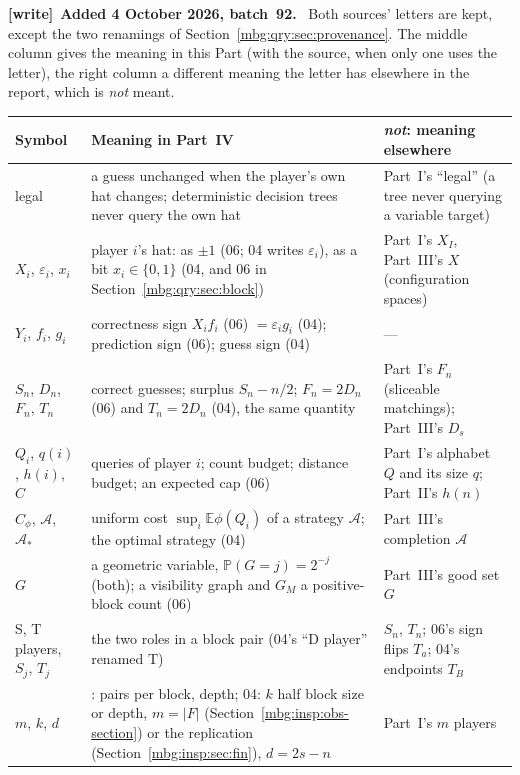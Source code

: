 \documentclass[11pt,letterpaper]{article}
\theoremstyle{definition}
\newcommand{\E}{\mathbb E}
\newcommand{\Prb}{\mathbb P}
\newcommand{\A}{\mathcal A}
\newenvironment{writenote}[1][]{\par\smallskip\begingroup\small
 \noindent\textbf{[write]}\if\relax\detokenize{#1}\relax\else~\textbf{#1.}\fi\ }%
 {\par\endgroup\smallskip}
\begin{document}
\begin{writenote}[Added 4 October 2026, batch~92]
Both sources' letters are kept, except the two renamings of Section~\ref{mbg:qry:sec:provenance}. The middle column gives the meaning in this Part (with the source, when only one uses the letter), the right column a different meaning the letter has elsewhere in the report, which is \emph{not} meant.
\begin{longtable}{>{\raggedright\arraybackslash}p{}>{\raggedright\arraybackslash}p{}>{\raggedright\arraybackslash}p{}}
\toprule
Symbol & Meaning in Part~IV & \emph{not}: meaning elsewhere\\
\midrule
\endhead
legal & a guess unchanged when the player's own hat changes; deterministic decision trees never query the own hat & Part~I's ``legal'' (a tree never querying a variable target)\\
$X_i$, $\varepsilon_i$, $x_i$ & player $i$'s hat: as $\pm1$ (06; 04 writes $\varepsilon_i$), as a bit $x_i\in\{0,1\}$ (04, and 06 in Section~\ref{mbg:qry:sec:block}) & Part~I's $X_I$, Part~III's $X$ (configuration spaces)\\
$Y_i$, $f_i$, $g_i$ & correctness sign $X_if_i$ (06) $=\varepsilon_ig_i$ (04); prediction sign (06); guess sign (04) & ---\\
$S_n$, $D_n$, $F_n$, $T_n$ & correct guesses; surplus $S_n-n/2$; $F_n=2D_n$ (06) and $T_n=2D_n$ (04), the same quantity & Part~I's $F_n$ (sliceable matchings); Part~III's $D_s$\\
$Q_i$, $q(i)$, $h(i)$, $C$ & queries of player $i$; count budget; distance budget; an expected cap (06) & Part~I's alphabet $Q$ and its size $q$; Part~II's $h(n)$\\
$C_\phi$, $\mathcal A$, $\mathcal A_*$ & uniform cost $\sup_i\E\phi(Q_i)$ of a strategy $\mathcal A$; the optimal strategy (04) & Part~III's completion $\A$\\
$G$ & a geometric variable, $\Prb(G=j)=2^{-j}$ (both); a visibility graph and $G_M$ a positive-block count (06) & Part~III's good set $G$\\
S, T players, $S_j$, $T_j$ & the two roles in a block pair (04's ``D player'' renamed T) & $S_n$, $T_n$; 06's sign flips $T_a$; 04's endpoints $T_B$\\
$m$, $k$, $d$ & 06: pairs per block, depth; 04: $k$ half block size or depth, $m=|F|$ (Section~\ref{mbg:insp:obs-section}) or the replication (Section~\ref{mbg:insp:sec:fin}), $d=2s-n$ & Part~I's $m$ players\\

\end{longtable}
\end{writenote}
\end{document}
